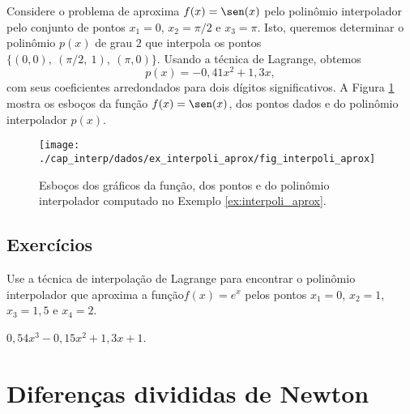 \begin{ex}\label{ex:interpoli_aprox}
  Considere o problema de aproxima $f(x) = \sen(x)$ pelo polinômio interpolador pelo conjunto de pontos $x_1=0$, $x_2=\pi/2$ e $x_3=\pi$. Isto, queremos determinar o polinômio $p(x)$ de grau $2$ que interpola os pontos $\{(0,0),~(\pi/2,~1),~(\pi,0)\}$. Usando a técnica de Lagrange, obtemos
  \begin{equation}
    p(x) = -0,41x^2 + 1,3x,
  \end{equation}
com seus coeficientes arredondados para dois dígitos significativos. A Figura \ref{fig:interpoli_aprox} mostra os esboços da função $f(x)=\sen(x)$, dos pontos dados e do polinômio interpolador $p(x)$.

\begin{figure}[h!]
  \centering
  \texttt{[image: ./cap\_interp/dados/ex\_interpoli\_aprox/fig\_interpoli\_aprox]}
  \caption{Esboços dos gráficos da função, dos pontos e do polinômio interpolador computado no Exemplo \ref{ex:interpoli_aprox}.}
  \label{fig:interpoli_aprox}
\end{figure}

% 
\end{ex}

\subsection*{Exercícios}

\begin{exer}
  Use a técnica de interpolação de Lagrange para encontrar o polinômio interpolador que aproxima a função$f(x)=e^{x}$ pelos pontos $x_1=0$, $x_2=1$, $x_3=1,5$ e $x_4=2$.
\end{exer}
\begin{resp}
$0,54x^3 - 0,15x^2 + 1,3x + 1$.
\end{resp}

\emconstrucao

\section{Diferenças divididas de Newton}\label{cap_interp_difdiv}

